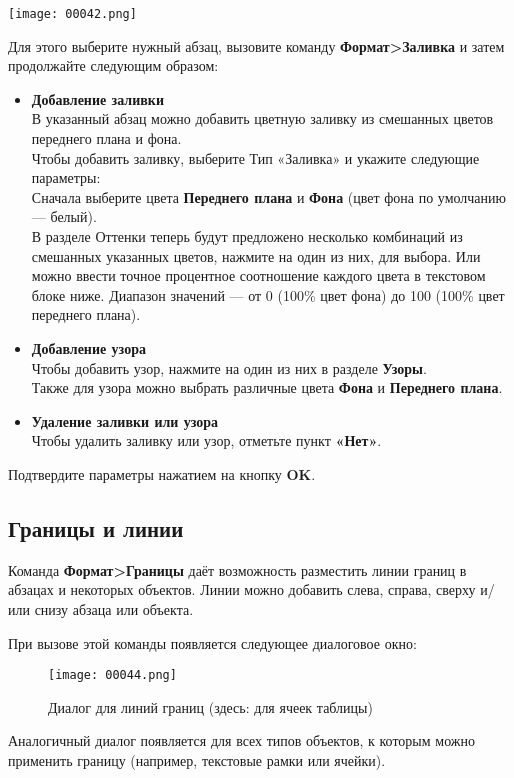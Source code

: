 \documentclass[a4paper,10pt]{article}
\begin{document}
\texttt{[image: 00042.png]}

Для этого выберите нужный абзац, вызовите команду \textbf{Формат>Заливка} и затем продолжайте следующим образом:
\begin{itemize}
 \item \textbf{Добавление заливки}\\
 В указанный абзац можно добавить цветную заливку из смешанных цветов переднего плана и фона.\\
 Чтобы добавить заливку, выберите Тип «Заливка» и укажите следующие параметры:\\
Сначала выберите цвета \textbf{Переднего плана} и \textbf{Фона} (цвет фона по умолчанию — белый).\\
В разделе Оттенки теперь будут предложено несколько комбинаций из смешанных указанных цветов, нажмите на один из них, для выбора. Или можно ввести точное процентное соотношение каждого цвета в текстовом блоке ниже. Диапазон значений — от 0 (100\% цвет фона) до 100 (100\% цвет переднего плана).
\item \textbf{Добавление узора}\\
Чтобы добавить узор, нажмите на один из них в разделе \textbf{Узоры}.\\
Также для узора можно выбрать различные цвета \textbf{Фона} и \textbf{Переднего плана}.
\item \textbf{Удаление заливки или узора}\\
Чтобы удалить заливку или узор, отметьте пункт \textbf{«Нет»}. 
\end{itemize}

Подтвердите параметры нажатием на кнопку \textbf{OK}.

\subsection{Границы и линии}
Команда \textbf{Формат>Границы} даёт возможность разместить линии границ в абзацах и некоторых объектов. Линии можно добавить слева, справа, сверху и/или снизу абзаца или объекта.

При вызове этой команды появляется следующее диалоговое окно:

\begin{figure}[ht]
\texttt{[image: 00044.png]}
\centering
\caption{Диалог для линий границ (здесь: для ячеек таблицы)}
\end{figure}

Аналогичный диалог появляется для всех типов объектов, к которым можно применить границу (например, текстовые рамки или ячейки).
\end{document}
